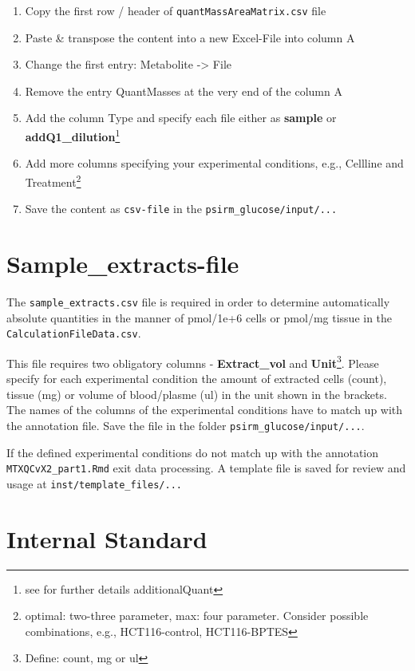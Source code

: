 \documentclass[]{book}
\providecommand{\tightlist}{%
  \setlength{\itemsep}{0pt}\setlength{\parskip}{0pt}}
\let\rmarkdownfootnote\footnote%
\def\footnote{\protect\rmarkdownfootnote}
\theoremstyle{definition}
\theoremstyle{definition}
\theoremstyle{definition}
\theoremstyle{remark}
\begin{document}
\begin{enumerate}
\def\labelenumi{\arabic{enumi}.}
\tightlist
\item
  Copy the first row / header of \texttt{quantMassAreaMatrix.csv} file
\item
  Paste \& transpose the content into a new Excel-File into column A
\item
  Change the first entry: Metabolite -\textgreater{} File
\item
  Remove the entry QuantMasses at the very end of the column A
\item
  Add the column Type and specify each file either as \textbf{sample} or
  \textbf{addQ1\_dilution}\footnote{see for further details
    additionalQuant}
\item
  Add more columns specifying your experimental conditions, e.g.,
  Cellline and Treatment\footnote{optimal: two-three parameter, max:
    four parameter. Consider possible combinations, e.g.,
    HCT116-control, HCT116-BPTES}
\item
  Save the content as \texttt{csv-file} in the
  \texttt{psirm\_glucose/input/...}
\end{enumerate}

\section{Sample\_extracts-file}\label{sample_extracts-file}

The \texttt{sample\_extracts.csv} file is required in order to determine
automatically absolute quantities in the manner of pmol/1e+6 cells or
pmol/mg tissue in the \texttt{CalculationFileData.csv}.

This file requires two obligatory columns - \textbf{Extract\_vol} and
\textbf{Unit}\footnote{Define: count, mg or ul}. Please specify for each
experimental condition the amount of extracted cells (count), tissue
(mg) or volume of blood/plasme (ul) in the unit shown in the brackets.\\
The names of the columns of the experimental conditions have to match up
with the annotation file. Save the file in the folder
\texttt{psirm\_glucose/input/...}.

If the defined experimental conditions do not match up with the
annotation \texttt{MTXQCvX2\_part1.Rmd} exit data processing. A template
file is saved for review and usage at \texttt{inst/template\_files/...}

\section{Internal Standard}\label{internal-standard}
\end{document}
